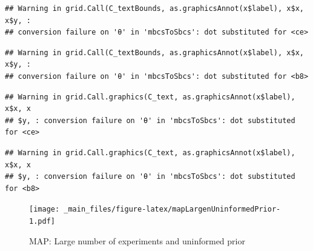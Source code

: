 \documentclass[]{book}
\theoremstyle{definition}
\theoremstyle{definition}
\theoremstyle{definition}
\theoremstyle{remark}
\begin{document}
\begin{verbatim}
## Warning in grid.Call(C_textBounds, as.graphicsAnnot(x$label), x$x, x$y, :
## conversion failure on 'θ' in 'mbcsToSbcs': dot substituted for <ce>
\end{verbatim}

\begin{verbatim}
## Warning in grid.Call(C_textBounds, as.graphicsAnnot(x$label), x$x, x$y, :
## conversion failure on 'θ' in 'mbcsToSbcs': dot substituted for <b8>
\end{verbatim}

\begin{verbatim}
## Warning in grid.Call.graphics(C_text, as.graphicsAnnot(x$label), x$x, x
## $y, : conversion failure on 'θ' in 'mbcsToSbcs': dot substituted for <ce>
\end{verbatim}

\begin{verbatim}
## Warning in grid.Call.graphics(C_text, as.graphicsAnnot(x$label), x$x, x
## $y, : conversion failure on 'θ' in 'mbcsToSbcs': dot substituted for <b8>
\end{verbatim}

\begin{figure}
\centering
\texttt{[image: \_main\_files/figure-latex/mapLargenUninformedPrior-1.pdf]}
\caption{\label{fig:mapLargenUninformedPrior}MAP: Large number of
experiments and uninformed prior}
\end{figure}
\end{document}
